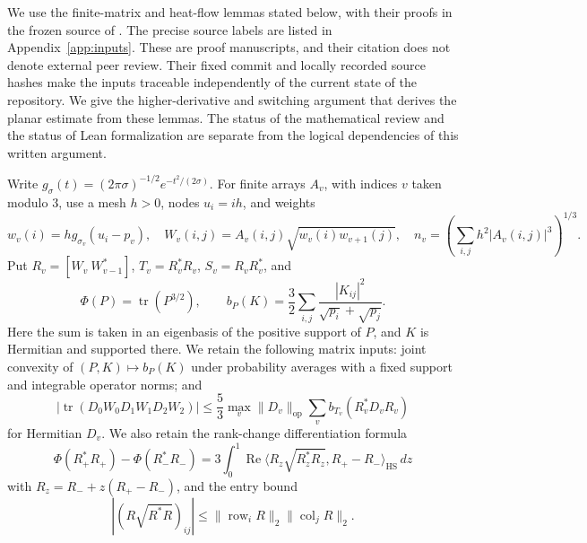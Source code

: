 \documentclass[11pt,a4paper]{article}
\theoremstyle{definition}
\newcommand{\1}{\mathbf1}
\begin{document}
We use the finite-matrix and heat-flow lemmas stated below, with
their proofs in the frozen source of \cite{FrozenMatrix,FrozenHeat}.
The precise source labels are listed in Appendix~\ref{app:inputs}.
These are proof manuscripts, and their citation does not denote external
peer review. Their fixed commit and locally recorded source hashes make
the inputs traceable independently of the current state of the repository.
We give the higher-derivative and switching argument that derives the
planar estimate from these lemmas. The status of the mathematical
review and the status of Lean formalization are separate from the
logical dependencies of this written argument.

Write $g_\sigma(t)=(2\pi\sigma)^{-1/2}e^{-t^2/(2\sigma)}$.
For finite arrays $A_v$, with indices $v$ taken modulo $3$, use a mesh
$h>0$, nodes $u_i=ih$, and weights
\[
 w_v(i)=h g_{\sigma_v}(u_i-p_v),\quad
 W_v(i,j)=A_v(i,j)\sqrt{w_v(i)w_{v+1}(j)},\quad
 n_v=\left(\sum_{i,j}h^2|A_v(i,j)|^3\right)^{1/3}.
\]
Put $R_v=[W_v\ W_{v-1}^*]$, $T_v=R_v^*R_v$, $S_v=R_vR_v^*$, and
\[
 \Phi(P)=\operatorname{tr}(P^{3/2}),\qquad
 b_P(K)=\frac32\sum_{i,j}\frac{|K_{ij}|^2}{\sqrt{p_i}+\sqrt{p_j}}.
\]
Here the sum is taken in an eigenbasis of the positive support of $P$,
and $K$ is Hermitian and supported there. We retain the following
matrix inputs: joint convexity of $(P,K)\mapsto b_P(K)$ under probability
averages with a fixed support and integrable operator norms; and
\begin{equation}\label{eq:matrix-input}
 |\operatorname{tr}(D_0W_0D_1W_1D_2W_2)|
 \le\frac53\max_v\|D_v\|_{\mathrm{op}}
       \sum_v b_{T_v}(R_v^*D_vR_v)
\end{equation}
for Hermitian $D_v$. We also retain the rank-change differentiation
formula
\[
 \Phi(R_+^*R_+)-\Phi(R_-^*R_-)
 =3\int_0^1\operatorname{Re}\langle R_z\sqrt{R_z^*R_z},R_+-R_-\rangle_{\mathrm{HS}}\,dz
\]
with $R_z=R_-+z(R_+-R_-)$, and the entry bound
\[
 |(R\sqrt{R^*R})_{ij}|
 \le\|\operatorname{row}_iR\|_2\|\operatorname{col}_jR\|_2.
\]
\end{document}
